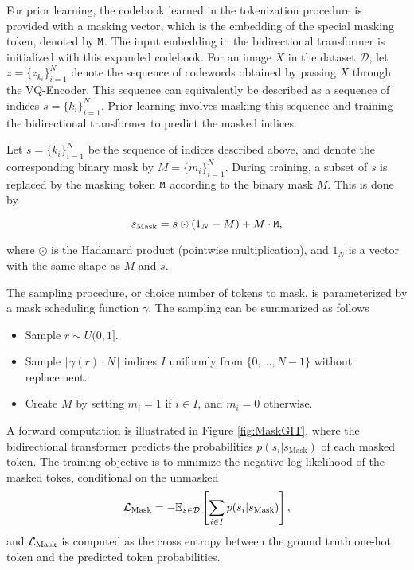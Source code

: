 \documentclass[../../thesis.tex]{subfiles}
\begin{document}
For prior learning, the codebook learned in the tokenization procedure is provided with a masking vector, which is the embedding of the special masking token, denoted by $\texttt{M}$. The input embedding in the bidirectional transformer is initialized with this expanded codebook. For an image $X$ in the dataset $\mathcal{D}$, let $z = \{z_{k_i}\}_{i=1}^N$ denote the sequence of codewords obtained by passing $X$ through the VQ-Encoder. This sequence can equivalently be described as a sequence of indices $s = \{k_i\}_{i=1}^N$. Prior learning involves masking this sequence and training the bidirectional transformer to predict the masked indices.
\newline

Let $s = \{k_i\}_{i=1}^N$ be the sequence of indices described above, and denote the corresponding binary mask by $M = \{m_i\}_{i=1}^N$. During training, a subset of $s$ is replaced by the masking token $\texttt{M}$ according to the binary mask $M$. This is done by 

\begin{equation}
    s_\text{Mask} = s\odot (1_N-M) +  M\cdot\texttt{M},
\end{equation}

where $\odot$ is the Hadamard product (pointwise multiplication), and $1_N$ is a vector with the same shape as $M$ and $s$.\newline

The sampling procedure, or choice number of tokens to mask, is parameterized by a mask scheduling function $\gamma$. The sampling can be summarized as follows

\begin{itemize}
    \item Sample $r \sim U(0,1]$.
    \item Sample $\lceil \gamma(r)\cdot N \rceil$ indices $I$ uniformly from $\{0,\dots,N-1\}$ without replacement. 
    \item Create $M$ by setting $m_i = 1$ if $i\in I$, and $m_i = 0$ otherwise.
\end{itemize}

A forward computation is illustrated in Figure \ref{fig:MaskGIT}, where the bidirectional transformer predicts the probabilities $p(s_i|s_\text{Mask})$ of each masked token. The training objective is to minimize the negative log likelihood of the masked tokes, conditional on the unmasked
\begin{equation}
    \mathcal{L}_\text{Mask} = -\mathbb{E}_{s\in \mathcal{D}}\left[\sum_{i \in I} p(s_i|s_\text{Mask} ) \right],
\end{equation}
and $\mathcal{L}_\text{Mask}$ is computed as the cross entropy between the ground truth one-hot token and the predicted token probabilities. 
\end{document}
